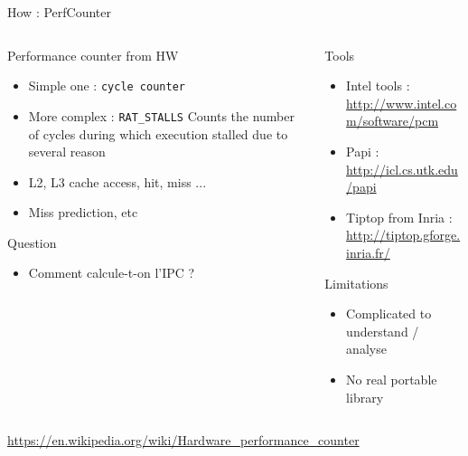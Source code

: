 %
\begin{Frame}{How : PerfCounter}
  \begin{columns}[t]
    \begin{column}{5cm} %
      \begin{block}{Performance counter from HW}
        \begin{itemize}
        \item Simple one : \texttt{cycle counter}
        \item More complex : \texttt{RAT\_STALLS} Counts the number of cycles during which execution stalled due to several reason
        \item L2, L3 cache access, hit, miss ...
        \item Miss prediction, etc
        \end{itemize}
      \end{block} 
      \begin{alertblock}{Question}
        \begin{itemize}
        \item Comment calcule-t-on l'IPC ?
        \end{itemize}
      \end{alertblock}
    \end{column}
    
    \begin{column}{5cm} %
      \begin{block}{Tools}
        \begin{itemize}
        \item Intel tools : \url{http://www.intel.com/software/pcm}
        \item Papi : \url{http://icl.cs.utk.edu/papi}
        \item Tiptop from Inria : \url{http://tiptop.gforge.inria.fr/}
        \end{itemize}
      \end{block}   
      \begin{alertblock}{Limitations}
        \begin{itemize}
        \item Complicated to understand / analyse
        \item No real portable library
        \end{itemize}
      \end{alertblock}   
    \end{column}
  \end{columns}  
\url{https://en.wikipedia.org/wiki/Hardware_performance_counter}
\end{Frame}


